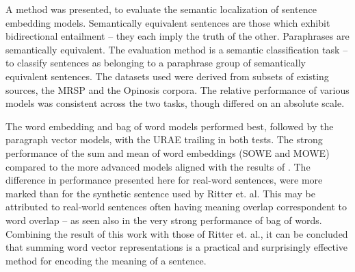 \documentclass[]{book}
\begin{document}
\label{sec:Conclusion}

A method was presented, to evaluate the semantic localization of sentence
embedding models. Semantically equivalent sentences are those which
exhibit bidirectional entailment -- they each imply the truth of the
other. Paraphrases are semantically equivalent. The evaluation method
is a semantic classification task -- to classify sentences as belonging
to a paraphrase group of semantically equivalent sentences. The datasets
used were derived from subsets of existing sources, the MRSP and the
Opinosis corpora. The relative performance of various models was consistent
across the two tasks, though differed on an absolute scale.

The word embedding and bag of word models performed best, followed
by the paragraph vector models, with the URAE trailing in both tests.
The strong performance of the sum and mean of word embeddings (SOWE
and MOWE) compared to the more advanced models aligned with the results
of \citet{RitterPosition}. The difference in performance
presented here for real-word sentences, were more marked than for
the synthetic sentence used by Ritter et. al. This may be attributed
to real-world sentences often having meaning overlap correspondent
to word overlap -- as seen also in the very strong performance of
bag of words. Combining the result of this work with those of Ritter
et. al., it can be concluded that summing word vector representations
is a practical and surprisingly effective method for encoding the
meaning of a sentence. 
\end{document}

